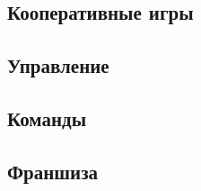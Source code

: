 

\subsection{Кооперативные игры}



\subsection{Управление}



\subsection{Команды}



\subsection{Франшиза}



